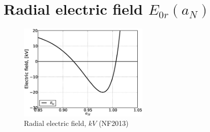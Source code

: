 \documentclass[11pt,oneside,a4paper,notitlepage]{article}
\begin{document}
\section{Radial electric field $E_{0r}(a_N)$}
\begin{figure}[ht]
 \centering
 \includegraphics[width=0.55\textwidth]{evans60/E60.eps}
 \caption{Radial electric field, $kV$ (NF2013)}
 \label{fig:Efield60}
\end{figure}
\end{document}
